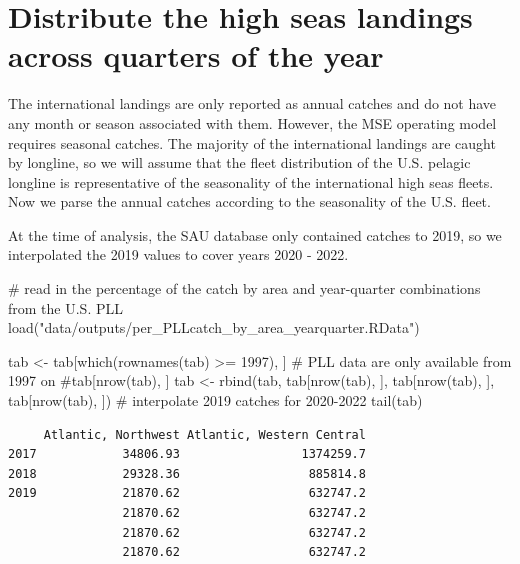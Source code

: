 \documentclass[
  letterpaper,
  oneside,
  open=any]{scrbook}
\newenvironment{Shaded}{\begin{snugshade}}{\end{snugshade}}
\newcommand{\CommentTok}[1]{\textcolor[rgb]{0.37,0.37,0.37}{#1}}
\newcommand{\DecValTok}[1]{\textcolor[rgb]{0.68,0.00,0.00}{#1}}
\newcommand{\FunctionTok}[1]{\textcolor[rgb]{0.28,0.35,0.67}{#1}}
\newcommand{\NormalTok}[1]{\textcolor[rgb]{0.00,0.23,0.31}{#1}}
\newcommand{\OtherTok}[1]{\textcolor[rgb]{0.00,0.23,0.31}{#1}}
\newcommand{\SpecialCharTok}[1]{\textcolor[rgb]{0.37,0.37,0.37}{#1}}
\newcommand{\StringTok}[1]{\textcolor[rgb]{0.13,0.47,0.30}{#1}}
\begin{document}
\section{Distribute the high seas landings across quarters of the
year}\label{distribute-the-high-seas-landings-across-quarters-of-the-year}

The international landings are only reported as annual catches and do
not have any month or season associated with them. However, the MSE
operating model requires seasonal catches. The majority of the
international landings are caught by longline, so we will assume that
the fleet distribution of the U.S. pelagic longline is representative of
the seasonality of the international high seas fleets. Now we parse the
annual catches according to the seasonality of the U.S. fleet.

At the time of analysis, the SAU database only contained catches to
2019, so we interpolated the 2019 values to cover years 2020 - 2022.

\begin{Shaded}
\begin{Highlighting}[]
\CommentTok{\# read in the percentage of the catch by area and year{-}quarter combinations from the U.S. PLL}
\FunctionTok{load}\NormalTok{(}\StringTok{"data/outputs/per\_PLLcatch\_by\_area\_yearquarter.RData"}\NormalTok{)  }

\NormalTok{tab }\OtherTok{\textless{}{-}}\NormalTok{ tab[}\FunctionTok{which}\NormalTok{(}\FunctionTok{rownames}\NormalTok{(tab) }\SpecialCharTok{\textgreater{}=} \DecValTok{1997}\NormalTok{), ]  }\CommentTok{\# PLL data are only available from 1997 on }
\CommentTok{\#tab[nrow(tab), ]}
\NormalTok{tab }\OtherTok{\textless{}{-}} \FunctionTok{rbind}\NormalTok{(tab, tab[}\FunctionTok{nrow}\NormalTok{(tab), ], tab[}\FunctionTok{nrow}\NormalTok{(tab), ], tab[}\FunctionTok{nrow}\NormalTok{(tab), ])  }\CommentTok{\# interpolate 2019 catches for 2020{-}2022}
\FunctionTok{tail}\NormalTok{(tab)}
\end{Highlighting}
\end{Shaded}

\begin{verbatim}
     Atlantic, Northwest Atlantic, Western Central
2017            34806.93                 1374259.7
2018            29328.36                  885814.8
2019            21870.62                  632747.2
                21870.62                  632747.2
                21870.62                  632747.2
                21870.62                  632747.2
\end{verbatim}
\end{document}
